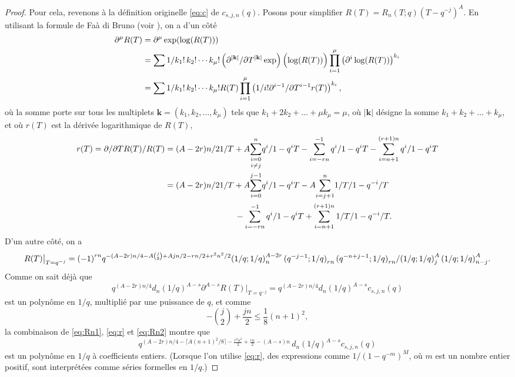 \documentclass[12pt]{amsart}
\theoremstyle{remark}
\numberwithin{equation}{section}
\begin{document}
\begin{proof}
Pour cela, revenons {\`a} la d{\'e}finition originelle \eqref{eq:c} de
$c_{s,j,n}(q)$. Posons pour simplifier $R(T)=R_n(T;q)(T-q^{-j})^A$.
En utilisant la formule de Fa{\`a} di Bruno
(voir \cite{jo}), on a d'un c{\^o}t{\'e} 
\begin{align} \label{eq:Rn1}
\partial^{\mu}R(T)&=\partial^{\mu}\exp(\log(R(T)))\\
\notag
&=
\sum _{} ^{}\frac {1} {k_1!\,k_2!\cdots k_\mu!}\left(\frac
{\partial^{\vert \mathbf k\vert}}
{\partial T^{\vert \mathbf k\vert}}\exp\right)\Bigl(\log(R(T))\Bigr)
\prod _{i=1} ^{\mu}\left({\partial^i
\log(R(T))} \right)^{k_i}\\
\notag
&=
\sum _{} ^{}\frac {1} {k_1!\,k_2!\cdots k_\mu!}R(T)
\prod _{i=1} ^{\mu}\left(\frac {1} {i!}\frac {\partial^{i-1}}
{\partial T^{i-1}} r(T) \right)^{k_i},
\end{align}
o{\`u} la somme porte sur tous les multiplets $\mathbf k=
(k_1,k_2,\dots,k_\mu)$ tels que
$k_1+2k_2+\dots+\mu k_\mu=\mu$, o{\`u} $\vert \mathbf k\vert$
d{\'e}signe la somme $k_1+k_2+\dots+k_\mu$, et o{\`u} $r(T)$ est la
d{\'e}riv{\'e}e logarithmique de $R(T)$,
\begin{align} \label{eq:r} 
r(T)=\frac{\frac {\partial}
{\partial T}R(T)} {R(T)}
&=\frac {(A-2r)n} {2}\frac {1} {T}+A\underset{i\ne j}{
\sum _{i=0} ^{n}}\frac {q^i} {1-q^iT}
-\sum _{i=-r n} ^{-1}\frac {q^i} 
{1-q^iT}-
\sum _{i=n+1} ^{(r+1)n}\frac {q^i} 
{1-q^iT}\\
\notag
&=
\frac {(A-2r)n} {2}\frac {1} {T}+A{
\sum _{i=0} ^{j-1}}\frac {q^i} {1-q^iT}
-A{
\sum _{i=j+1} ^{n}}\frac {1/T} {1-q^{-i}/T}\\
\notag
&\kern3cm
-\sum _{i=-r n} ^{-1}\frac {q^i} 
{1-q^iT}+
\sum _{i=n+1} ^{(r+1)n}\frac {1/T} 
{1-q^{-i}/T}.
\end{align} 
D'un autre c{\^o}t{\'e}, on a
\begin{equation} \label{eq:Rn2} 
R(T)\big\vert_{T=q^{-j}}=
{\left( -1 \right) }^{r n} 
 q^{- (A-2r)n/4-{A }\binom j2 +
        \frac{A j n}{2} -  \frac{ rn}{2}+ \frac{r^2n^2}{2}}
\frac{{
     ({  \frac{1}{q}}; \frac{1}{q})}
        _{n} ^{A - 2 r}\,{({\let \over / \def\frac#1#2{#1 / #2}
      q^{-j-1}}; \frac{1}{q})} _{rn} \,
    { ({\let \over / \def\frac#1#2{#1 / #2} q^{- n+j-1}};
      \frac{1}{q})} _{rn} }{{({
        \frac{1}{q}}; \frac{1}{q})} _{j} ^A\,
    { ({ \frac{1}{q}}; \frac{1}{q})}
        _{n-j} ^A}.
\end{equation}
Comme on sait d{\'e}j{\`a} que 
$$
q^{(A-2r)n/4}d_n(1/q)^{A-s}\partial^{A-s} R(T)\big\vert_{T=q^{-j}}
=q^{(A-2r)n/4}d_n(1/q)^{A-s}c_{s,j,n}(q) 
$$ 
est un polyn{\^o}me 
en $1/q$, multipli{\'e} par une puissance de $q$, et comme 
$$-\binom j2+\frac {jn} {2}\le \frac {1} {8}(n+1)^2,$$
la combinaison de \eqref{eq:Rn1}, \eqref{eq:r} et \eqref{eq:Rn2}
montre que
$$
q^{(A-2r)n/4-\lceil A (n+1)^2/8\rceil
-\frac {r^2n^2} {2}+\frac {rn} {2}- (A-s)n}\,
d_n(1/q)^{A-s}  c_{s,j,n}(q)
$$
est un polyn{\^o}me en $1/q$ {\`a} coefficients entiers. 
(Lorsque l'on utilise \eqref{eq:r}, 
des expressions comme $1/(1-q^{-m})^M$, o{\`u} $m$ est un nombre entier
positif, sont interpr{\'e}t{\'e}es comme s{\'e}ries formelles en $1/q$.)


\end{proof}
\end{document}

